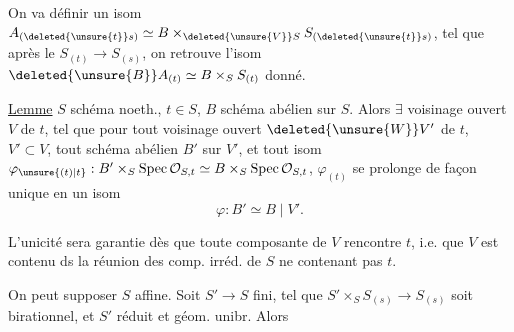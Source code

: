  On va définir un isom $A_{(\deleted{\unsure{t}}s)}\simeq B\times_{\deleted{\unsure{V}}S}S_{(\deleted{\unsure{t}}s)}$, tel que  après le $S_{(t)}\to S_{(s)}$, on retrouve l'isom $\deleted{\unsure{B}}A_{(t)}\simeq B\times_S S_{(t)}$ donné. 

\uline{Lemme} $S$ schéma noeth., \inserted{\deleted{[réduit]}} $t\in S$, $B$ schéma abélien sur $S$. Alors $\exists$ voisinage ouvert $V$ de $t$,  tel que pour  tout voisinage ouvert $\deleted{\unsure{W}}V'$ de $t$, $V'\subset V$, tout schéma abélien $B'$ sur $V'$, et tout isom $\varphi_{\unsure{(t)|t}}: B'\times_S\operatorname{Spec}\mathcal O_{S,t}\simeq B\times_S\operatorname{Spec}\mathcal O_{S,t}$, $\varphi_{(t)}$ se prolonge de façon unique en un isom
\[
\varphi:B'\simeq B\mid V'.
\]

L'unicité sera garantie dès que toute composante  de $V$ rencontre $t$, i.e. que $V$ est contenu ds la réunion des comp. irréd. de $S$ ne contenant pas $t$.

 On peut supposer $S$ affine.  Soit $S'\to S$ fini, tel que $S'\times_S S_{(s)}\to S_{(s)}$ soit birationnel, et $S'$ réduit et géom. unibr. Alors

